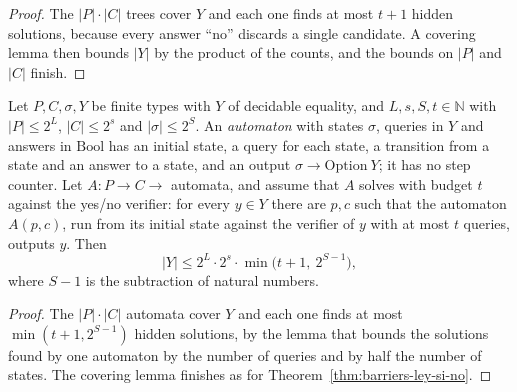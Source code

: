 \begin{proof}
  \leanok
  The $|P| \cdot |C|$ trees cover $Y$ and each one finds at most $t + 1$ hidden solutions, because
  every answer ``no'' discards a single candidate. A covering lemma then bounds $|Y|$ by the
  product of the counts, and the bounds on $|P|$ and $|C|$ finish.
\end{proof}

\begin{theorem}
  \label{thm:barriers-ley-cubo}
  \leanok
  Let $P, C, \sigma, Y$ be finite types with $Y$ of decidable equality, and $L, s, S, t \in
  \mathbb{N}$ with $|P| \le 2^L$, $|C| \le 2^s$ and $|\sigma| \le 2^S$. An \emph{automaton} with
  states $\sigma$, queries in $Y$ and answers in $\mathrm{Bool}$ has an initial state, a query for
  each state, a transition from a state and an answer to a state, and an output $\sigma \to
  \mathrm{Option}\ Y$; it has no step counter. Let $A : P \to C \to$ automata, and assume that $A$
  solves with budget $t$ against the yes/no verifier: for every $y \in Y$ there are $p, c$ such that
  the automaton $A(p, c)$, run from its initial state against the verifier of $y$ with at most $t$
  queries, outputs $y$. Then
  \[
    |Y| \le 2^L \cdot 2^s \cdot \min\bigl(t + 1,\ 2^{S - 1}\bigr),
  \]
  where $S - 1$ is the subtraction of natural numbers.
  \own{}
\end{theorem}

\begin{proof}
  \leanok
  The $|P| \cdot |C|$ automata cover $Y$ and each one finds at most $\min(t + 1, 2^{S-1})$ hidden
  solutions, by the lemma that bounds the solutions found by one automaton by the number of
  queries and by half the number of states. The covering lemma finishes as for
  Theorem~\ref{thm:barriers-ley-si-no}.
\end{proof}

